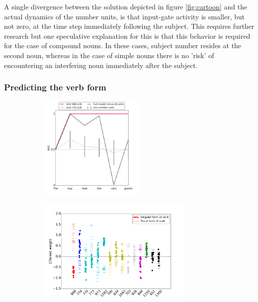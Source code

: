 A single divergence between the solution depicted in figure \ref{fig:cartoon} and the actual dynamics of the number units, is that input-gate activity is smaller, but not zero, at the time step immediately following the subject. This requires further research but one speculative explanation for this is that this behavior is required for the case of compound nouns. In these cases, subject number resides at the second noun, whereas in the case of simple nouns there is no 'risk' of encountering an interfering noun immediately after the subject. 

\subsubsection{Predicting the verb form}\label{subsec:output-weight}
\begin{figure}[t]
    \centering
    \begin{subfigure}{0.49\textwidth}
            \centering
            \includegraphics[height=5cm]{Figures/GAT1d_cell_nounpp_SR_LR_single_unit.png}
            \label{fig:GAT}
    \end{subfigure}
    \begin{subfigure}{0.49\textwidth}
            \centering
            \includegraphics[height=5cm]{Figures/Figure5_output_weights.png}
            \label{fig:output-weights}
    \end{subfigure}
    
\end{figure}

